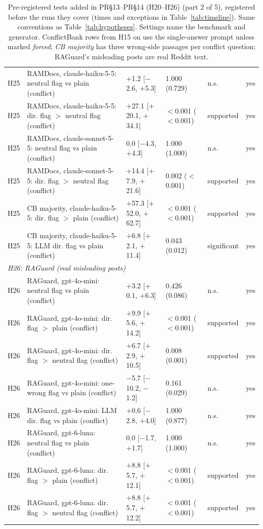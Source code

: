 \begin{table}[p]
{\begin{tabular}{lp{6.6cm}llll}
H25 & RAMDocs, claude-haiku-5-5: neutral flag vs plain (conflict) & $+$1.2 [$-$2.6, $+$5.3] & 1.000 (0.729) & n.s. & yes \\
H25 & RAMDocs, claude-haiku-5-5: dir. flag $>$ neutral flag (conflict) & $+$27.1 [$+$20.1, $+$34.1] & $<$0.001 ($<$0.001) & supported & yes \\
H25 & RAMDocs, claude-sonnet-5-5: neutral flag vs plain (conflict) & 0.0 [$-$4.3, $+$4.3] & 1.000 (1.000) & n.s. & yes \\
H25 & RAMDocs, claude-sonnet-5-5: dir. flag $>$ neutral flag (conflict) & $+$14.4 [$+$7.9, $+$21.6] & 0.002 ($<$0.001) & supported & yes \\
H25 & CB majority, claude-haiku-5-5: dir. flag $>$ plain (conflict) & $+$57.3 [$+$52.0, $+$62.7] & $<$0.001 ($<$0.001) & supported & yes \\
H25 & CB majority, claude-haiku-5-5: LLM dir. flag vs plain (conflict) & $+$6.8 [$+$2.1, $+$11.4] & 0.043 (0.012) & significant & yes \\
\multicolumn{6}{l}{\emph{H26: RAGuard (real misleading posts)}} \\
H26 & RAGuard, gpt-4o-mini: neutral flag vs plain (conflict) & $+$3.2 [$+$0.1, $+$6.3] & 0.426 (0.086) & n.s. & yes \\
H26 & RAGuard, gpt-4o-mini: dir. flag $>$ plain (conflict) & $+$9.9 [$+$5.6, $+$14.2] & $<$0.001 ($<$0.001) & supported & yes \\
H26 & RAGuard, gpt-4o-mini: dir. flag $>$ neutral flag (conflict) & $+$6.7 [$+$2.9, $+$10.5] & 0.008 (0.001) & supported & yes \\
H26 & RAGuard, gpt-4o-mini: one-wrong flag vs plain (conflict) & $-$5.7 [$-$10.2, $-$1.2] & 0.161 (0.029) & n.s. & yes \\
H26 & RAGuard, gpt-4o-mini: LLM dir. flag vs plain (conflict) & $+$0.6 [$-$2.8, $+$4.0] & 1.000 (0.877) & n.s. & yes \\
H26 & RAGuard, gpt-6-luna: neutral flag vs plain (conflict) & 0.0 [$-$1.7, $+$1.7] & 1.000 (1.000) & n.s. & yes \\
H26 & RAGuard, gpt-6-luna: dir. flag $>$ plain (conflict) & $+$8.8 [$+$5.7, $+$12.1] & $<$0.001 ($<$0.001) & supported & yes \\
H26 & RAGuard, gpt-6-luna: dir. flag $>$ neutral flag (conflict) & $+$8.8 [$+$5.7, $+$12.2] & $<$0.001 ($<$0.001) & supported & yes \\
\bottomrule
\end{tabular}}
\caption{Pre-registered tests added in PR\S13--PR\S14 (H20--H26) (part 2 of 5), registered before the runs they cover (times and exceptions in
Table~\ref{tab:timeline}). Same conventions as
Table~\ref{tab:hypotheses}. Settings name the benchmark and generator. ConflictBank rows from H15 on use the
single-answer prompt unless marked \emph{forced}; \emph{CB majority} has three wrong-side passages per conflict
question; RAGuard's misleading posts are real Reddit text.}
\label{tab:hypotheses7}
\end{table}

